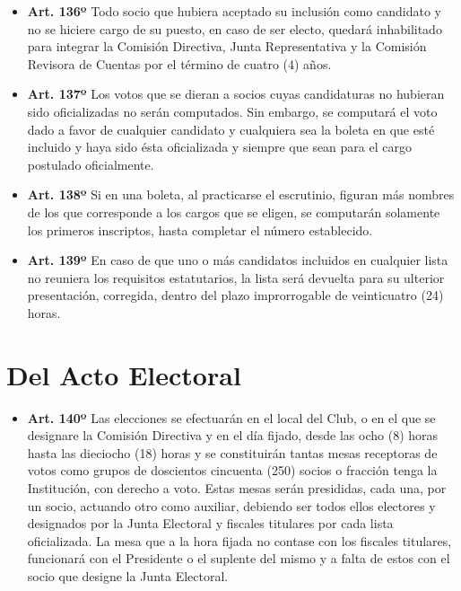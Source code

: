 \documentclass[]{book}
\providecommand{\tightlist}{%
  \setlength{\itemsep}{0pt}\setlength{\parskip}{0pt}}
\begin{document}
\begin{itemize}
\tightlist
\item
  \textbf{Art. 136º}
  Todo socio que hubiera aceptado su inclusión como candidato y no se hiciere cargo de su puesto, en caso de ser electo, quedará inhabilitado para integrar la Comisión Directiva, Junta Representativa y la Comisión Revisora de Cuentas por el término de cuatro (4) años.
\end{itemize}

\begin{itemize}
\tightlist
\item
  \textbf{Art. 137º}
  Los votos que se dieran a socios cuyas candidaturas no hubieran sido oficializadas no serán computados. Sin embargo, se computará el voto dado a favor de cualquier candidato y cualquiera sea la boleta en que esté incluido y haya sido ésta oficializada y siempre que sean para el cargo postulado oficialmente.
\end{itemize}

\begin{itemize}
\tightlist
\item
  \textbf{Art. 138º}
  Si en una boleta, al practicarse el escrutinio, figuran más nombres de los que corresponde a los cargos que se eligen, se computarán solamente los primeros inscriptos, hasta completar el número establecido.
\end{itemize}

\begin{itemize}
\tightlist
\item
  \textbf{Art. 139º}
  En caso de que uno o más candidatos incluidos en cualquier lista no reuniera los requisitos estatutarios, la lista será devuelta para su ulterior presentación, corregida, dentro del plazo improrrogable de veinticuatro (24) horas.
\end{itemize}

\hypertarget{del-acto-electoral}{%
\section{Del Acto Electoral}\label{del-acto-electoral}}

\begin{itemize}
\tightlist
\item
  \textbf{Art. 140º}
  Las elecciones se efectuarán en el local del Club, o en el que se designare la Comisión Directiva y en el día fijado, desde las ocho (8) horas hasta las dieciocho (18) horas y se constituirán tantas mesas receptoras de votos como grupos de doscientos cincuenta (250) socios o fracción tenga la Institución, con derecho a voto. Estas mesas serán presididas, cada una, por un socio, actuando otro como auxiliar, debiendo ser todos ellos electores y designados por la Junta Electoral y fiscales titulares por cada lista oficializada. La mesa que a la hora fijada no contase con los fiscales titulares, funcionará con el Presidente o el suplente del mismo y a falta de estos con el socio que designe la Junta Electoral.
\end{itemize}
\end{document}
